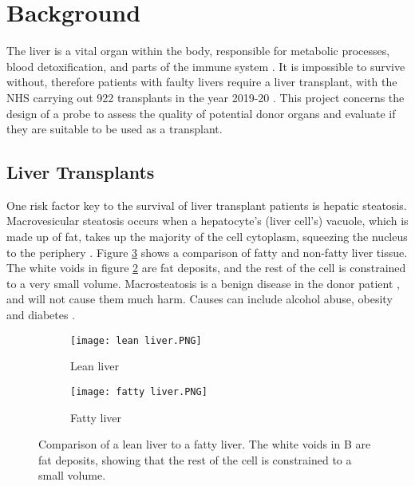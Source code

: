 \section{Background}

The liver is a vital organ within the body, responsible for metabolic processes, blood detoxification, and parts of the immune system \cite{liver_background}. It is impossible to survive without, therefore patients with faulty livers require a liver transplant, with the NHS carrying out 922 transplants in the year 2019-20 \cite{nhs_transplants}. This project concerns the design of a probe to assess the quality of potential donor organs and evaluate if they are suitable to be used as a transplant.


\subsection{Liver Transplants}
One risk factor key to the survival of liver transplant patients is hepatic steatosis. Macrovesicular steatosis occurs when a hepatocyte’s (liver cell’s) vacuole, which is made up of fat, takes up the majority of the cell cytoplasm, squeezing the nucleus to the periphery \cite{Imber2002}. Figure \ref{fig: livers} shows a comparison of fatty and non-fatty liver tissue. The white voids in figure \ref{fig: fatty liver} are fat deposits, and the rest of the cell is constrained to a very small volume. Macrosteatosis is a benign disease in the donor patient \cite{Imber2002}, and will not cause them much harm. Causes can include alcohol abuse, obesity and diabetes \cite{Imber2002}.\\

\begin{figure}[htbp]
	\centering
	\begin{subfigure}[b]{0.4\linewidth}
		\texttt{[image: lean liver.PNG]}
		\caption{Lean liver \cite{Bruno2008}}
		\label{}
	\end{subfigure}
	\begin{subfigure}[b]{0.4\linewidth}
		\texttt{[image: fatty liver.PNG]}
		\caption{Fatty liver \cite{Bruno2008}}
		\label{fig: fatty liver}
	\end{subfigure}
	\caption{Comparison of a lean liver to a fatty liver. The white voids in B are fat deposits, showing that the rest of the cell is constrained to a small volume.}
	\label{fig: livers}
\end{figure}	


